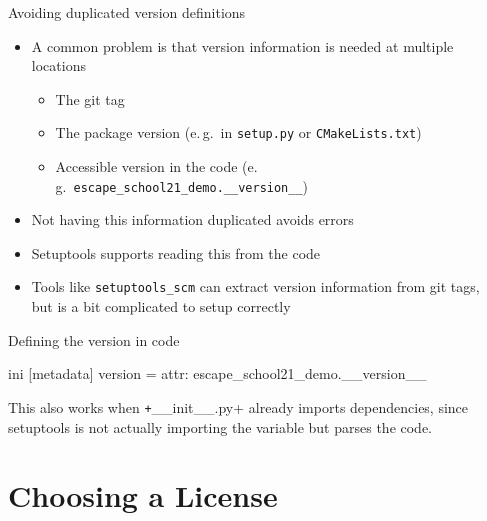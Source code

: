 \begin{frame}[fragile, c]{Avoiding duplicated version definitions}
  \begin{itemize}
    \item A common problem is that version information is needed at multiple locations
      \begin{itemize}
        \item The git tag
        \item The package version (e.\,g.\ in \texttt{setup.py} or \texttt{CMakeLists.txt})
        \item Accessible version in the code (e.\,g.\ \texttt{escape_school21_demo.__version__})
      \end{itemize}
    \item Not having this information duplicated avoids errors
    \item Setuptools supports reading this from the code
    \item Tools like \texttt{setuptools\_scm} can extract version information from git tags, \\
      but is a bit complicated to setup correctly
  \end{itemize}
\end{frame}

\begin{frame}[fragile, c]{Defining the version in code}

  \begin{code}[title=setup.cfg]{ini}
    [metadata]
    version = attr: escape_school21_demo.__version__
  \end{code}

  This also works when \texttt+__init__.py+ already imports dependencies,
  since setuptools is not actually importing the variable but parses the code.
\end{frame}


\section{Choosing a License}

